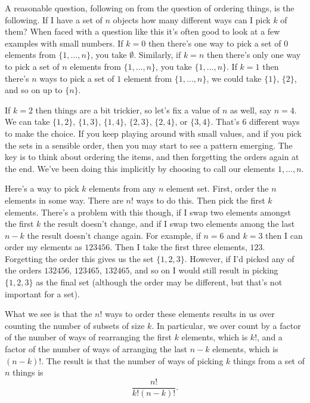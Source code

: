 \documentclass[fleqn]{LectureClass/LectureClass}
\begin{document}
    A reasonable question, following on from the question of ordering things, is the following.
    If I have a set of \(n\) objects how many different ways can I pick \(k\) of them?
    When faced with a question like this it's often good to look at a few examples with small numbers.
    If \(k = 0\) then there's one way to pick a set of \(0\) elements from \(\{1, \dotsc, n\}\), you take \(\emptyset\).
    Similarly, if \(k = n\) then there's only one way to pick a set of \(n\) elements from \(\{1, \dotsc, n\}\), you take \(\{1, \dotsc, n\}\).
    If \(k = 1\) then there's \(n\) ways to pick a set of \(1\) element from \(\{1, \dotsc, n\}\), we could take \(\{1\}\), \(\{2\}\), and so on up to \(\{n\}\).
     
    If \(k = 2\) then things are a bit trickier, so let's fix a value of \(n\) as well, say \(n = 4\).
    We can take \(\{1, 2\}\), \(\{1, 3\}\), \(\{1, 4\}\), \(\{2, 3\}\), \(\{2, 4\}\), or \(\{3, 4\}\).
    That's \(6\) different ways to make the choice.
    If you keep playing around with small values, and if you pick the sets in a sensible order, then you may start to see a pattern emerging.
    The key is to think about ordering the items, and then forgetting the orders again at the end.
    We've been doing this implicitly by choosing to call our elements \(1, \dotsc, n\).
     
    Here's a way to pick \(k\) elements from any \(n\) element set.
    First, order the \(n\) elements in some way.
    There are \(n!\) ways to do this.
    Then pick the first \(k\) elements.
    There's a problem with this though, if I swap two elements amongst the first \(k\) the result doesn't change, and if I swap two elements among the last \(n - k\) the result doesn't change again.
    For example, if \(n = 6\) and \(k = 3\) then I can order my elements as \(123456\).
    Then I take the first three elements, \(123\).
    Forgetting the order this gives us the set \(\{1, 2, 3\}\).
    However, if I'd picked any of the orders \(132456\), \(123465\), \(132465\), and so on I would still result in picking \(\{1, 2, 3\}\) as the final set (although the order may be different, but that's not important for a set).
     
    What we see is that the \(n!\) ways to order these elements results in us over counting the number of subsets of size \(k\).
    In particular, we over count by a factor of the number of ways of rearranging the first \(k\) elements, which is \(k!\), and a factor of the number of ways of arranging the last \(n - k\) elements, which is \((n - k)!\).
    The result is that the number of ways of picking \(k\) things from a set of \(n\) things is
    \begin{equation}
        \frac{n!}{k!(n - k)!}.
    \end{equation}
     
\end{document}
